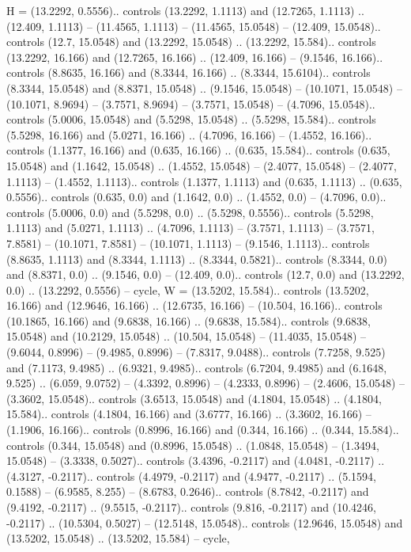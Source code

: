 {H} = {(13.2292, 0.5556).. controls (13.2292, 1.1113) and (12.7265, 1.1113) .. (12.409, 1.1113) -- (11.4565, 1.1113) -- (11.4565, 15.0548) -- (12.409, 15.0548).. controls (12.7, 15.0548) and (13.2292, 15.0548) .. (13.2292, 15.584).. controls (13.2292, 16.166) and (12.7265, 16.166) .. (12.409, 16.166) -- (9.1546, 16.166).. controls (8.8635, 16.166) and (8.3344, 16.166) .. (8.3344, 15.6104).. controls (8.3344, 15.0548) and (8.8371, 15.0548) .. (9.1546, 15.0548) -- (10.1071, 15.0548) -- (10.1071, 8.9694) -- (3.7571, 8.9694) -- (3.7571, 15.0548) -- (4.7096, 15.0548).. controls (5.0006, 15.0548) and (5.5298, 15.0548) .. (5.5298, 15.584).. controls (5.5298, 16.166) and (5.0271, 16.166) .. (4.7096, 16.166) -- (1.4552, 16.166).. controls (1.1377, 16.166) and (0.635, 16.166) .. (0.635, 15.584).. controls (0.635, 15.0548) and (1.1642, 15.0548) .. (1.4552, 15.0548) -- (2.4077, 15.0548) -- (2.4077, 1.1113) -- (1.4552, 1.1113).. controls (1.1377, 1.1113) and (0.635, 1.1113) .. (0.635, 0.5556).. controls (0.635, 0.0) and (1.1642, 0.0) .. (1.4552, 0.0) -- (4.7096, 0.0).. controls (5.0006, 0.0) and (5.5298, 0.0) .. (5.5298, 0.5556).. controls (5.5298, 1.1113) and (5.0271, 1.1113) .. (4.7096, 1.1113) -- (3.7571, 1.1113) -- (3.7571, 7.8581) -- (10.1071, 7.8581) -- (10.1071, 1.1113) -- (9.1546, 1.1113).. controls (8.8635, 1.1113) and (8.3344, 1.1113) .. (8.3344, 0.5821).. controls (8.3344, 0.0) and (8.8371, 0.0) .. (9.1546, 0.0) -- (12.409, 0.0).. controls (12.7, 0.0) and (13.2292, 0.0) .. (13.2292, 0.5556) -- cycle},
{W} = {(13.5202, 15.584).. controls (13.5202, 16.166) and (12.9646, 16.166) .. (12.6735, 16.166) -- (10.504, 16.166).. controls (10.1865, 16.166) and (9.6838, 16.166) .. (9.6838, 15.584).. controls (9.6838, 15.0548) and (10.2129, 15.0548) .. (10.504, 15.0548) -- (11.4035, 15.0548) -- (9.6044, 0.8996) -- (9.4985, 0.8996) -- (7.8317, 9.0488).. controls (7.7258, 9.525) and (7.1173, 9.4985) .. (6.9321, 9.4985).. controls (6.7204, 9.4985) and (6.1648, 9.525) .. (6.059, 9.0752) -- (4.3392, 0.8996) -- (4.2333, 0.8996) -- (2.4606, 15.0548) -- (3.3602, 15.0548).. controls (3.6513, 15.0548) and (4.1804, 15.0548) .. (4.1804, 15.584).. controls (4.1804, 16.166) and (3.6777, 16.166) .. (3.3602, 16.166) -- (1.1906, 16.166).. controls (0.8996, 16.166) and (0.344, 16.166) .. (0.344, 15.584).. controls (0.344, 15.0548) and (0.8996, 15.0548) .. (1.0848, 15.0548) -- (1.3494, 15.0548) -- (3.3338, 0.5027).. controls (3.4396, -0.2117) and (4.0481, -0.2117) .. (4.3127, -0.2117).. controls (4.4979, -0.2117) and (4.9477, -0.2117) .. (5.1594, 0.1588) -- (6.9585, 8.255) -- (8.6783, 0.2646).. controls (8.7842, -0.2117) and (9.4192, -0.2117) .. (9.5515, -0.2117).. controls (9.816, -0.2117) and (10.4246, -0.2117) .. (10.5304, 0.5027) -- (12.5148, 15.0548).. controls (12.9646, 15.0548) and (13.5202, 15.0548) .. (13.5202, 15.584) -- cycle},
